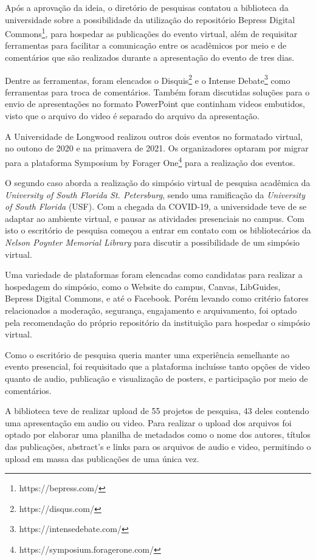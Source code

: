 Após a aprovação da ideia, o diretório de pesquisas contatou a biblioteca da universidade sobre
a possibilidade da utilização do repositório Bepress Digital Commons\footnote{https://bepress.com/},
para hospedar as publicações do evento virtual, além de requisitar ferramentas
para facilitar a comunicação entre os acadêmicos por meio e de comentários
que são realizados durante a apresentação do evento de tres dias.

Dentre as ferramentas, foram elencados o Disquis\footnote{https://disqus.com/}
e o Intense Debate\footnote{https://intensedebate.com/} como ferramentas para troca
de comentários. Também foram discutidas soluções para o envio de apresentações
no formato PowerPoint que continham videos embutidos, visto que o arquivo do video
é separado do arquivo da apresentação.

A Universidade de Longwood realizou outros dois eventos no formatado virtual,
no outono de 2020 e na primavera de 2021. Os organizadores optaram por migrar
para a plataforma Symposium by Forager One\footnote{https://symposium.foragerone.com/}
para a realização dos eventos.

O segundo caso aborda a realização do simpósio virtual de pesquisa acadêmica
da \emph{University of South Florida St. Petersburg}, sendo uma ramificação
da \emph{University of South Florida} (USF). Com a chegada da COVID-19,
a universidade teve de se adaptar ao ambiente virtual, e pausar as atividades
presenciais no campus. Com isto o escritório de pesquisa começou a entrar em contato
com os bibliotecários da \emph{Nelson Poynter Memorial Library} para discutir
a possibilidade de um simpósio virtual.

Uma variedade de plataformas foram elencadas como candidatas para realizar
a hospedagem do simpósio, como o Website do campus, Canvas, LibGuides,
Bepress Digital Commons, e até o Facebook. Porém levando como critério fatores
relacionados a moderação, segurança, engajamento e arquivamento, foi optado
pela recomendação do próprio repositório da instituição para hospedar o
simpósio virtual.

Como o escritório de pesquisa queria manter uma experiência semelhante
ao evento presencial, foi requisitado que a plataforma incluísse tanto opções
de video quanto de audio, publicação e visualização de posters, e participação
por meio de comentários.

A biblioteca teve de realizar upload de 55 projetos de pesquisa, 43 deles
contendo uma apresentação em audio ou video. Para realizar o upload dos arquivos
foi optado por elaborar uma planilha de metadados como o nome dos autores,
títulos das publicações, abstract's e links para os arquivos de audio e video,
permitindo o upload em massa das publicações de uma única vez.

